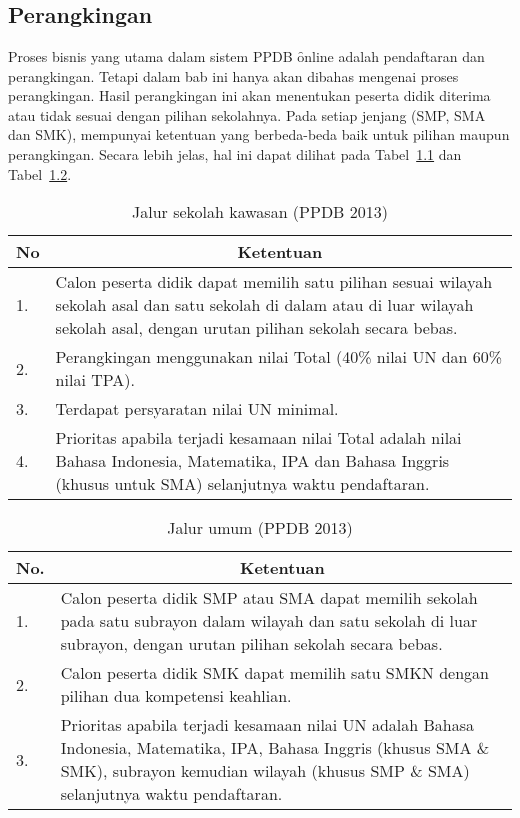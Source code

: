 \chapter{\babTiga}
\section{Perangkingan}
\label{sec:perangkingan}

Proses bisnis yang utama dalam sistem PPDB \f{online} adalah pendaftaran dan
perangkingan. Tetapi dalam bab ini hanya akan dibahas mengenai proses
perangkingan.  Hasil perangkingan ini akan menentukan peserta didik diterima
atau tidak sesuai dengan pilihan sekolahnya. Pada setiap jenjang (SMP, SMA dan
SMK), mempunyai ketentuan yang berbeda-beda baik untuk pilihan maupun
perangkingan. Secara lebih jelas, hal ini dapat dilihat pada
Tabel~\ref{tab:kawasan} dan Tabel~\ref{tab:umum}.

\begin{table}
\centering 
\caption{Jalur sekolah kawasan (PPDB 2013)}
\label{tab:kawasan}
\begin{tabular} {l p{10cm}}
  \hline
  \multicolumn{1}{c}{No} & \multicolumn{1}{c}{Ketentuan} \\
  \hline
  \hline

  1. & Calon peserta didik dapat memilih satu pilihan sesuai wilayah sekolah
  asal dan satu sekolah di dalam atau di luar wilayah sekolah asal, dengan
  urutan pilihan sekolah secara bebas. \\
  2. & Perangkingan menggunakan nilai Total (40\% nilai UN dan 60\% nilai TPA). \\
  3. & Terdapat persyaratan nilai UN minimal. \\
  4. & Prioritas apabila terjadi kesamaan nilai Total adalah nilai Bahasa
  Indonesia, Matematika, IPA dan Bahasa Inggris (khusus untuk SMA) selanjutnya
  waktu pendaftaran. \\

  \hline  
\end{tabular}
\end{table}

\begin{table}
\centering
\caption{Jalur umum (PPDB 2013)}
\label{tab:umum}
\begin{tabular} {l p{10cm}}
  \hline
  \multicolumn{1}{c}{No.} & \multicolumn{1}{c}{Ketentuan} \\
  \hline
  \hline
  1. & Calon peserta didik SMP atau SMA dapat memilih sekolah pada satu subrayon dalam
  wilayah dan satu sekolah di luar subrayon, dengan urutan pilihan sekolah
  secara bebas. \\
  2. & Calon peserta didik SMK dapat memilih satu SMKN dengan pilihan dua kompetensi keahlian. \\
  3. & Prioritas apabila terjadi kesamaan nilai UN adalah Bahasa Indonesia,
  Matematika, IPA, Bahasa Inggris (khusus SMA \& SMK), subrayon kemudian
  wilayah (khusus SMP \& SMA) selanjutnya waktu pendaftaran. \\
  \hline
\end{tabular}
\end{table}

